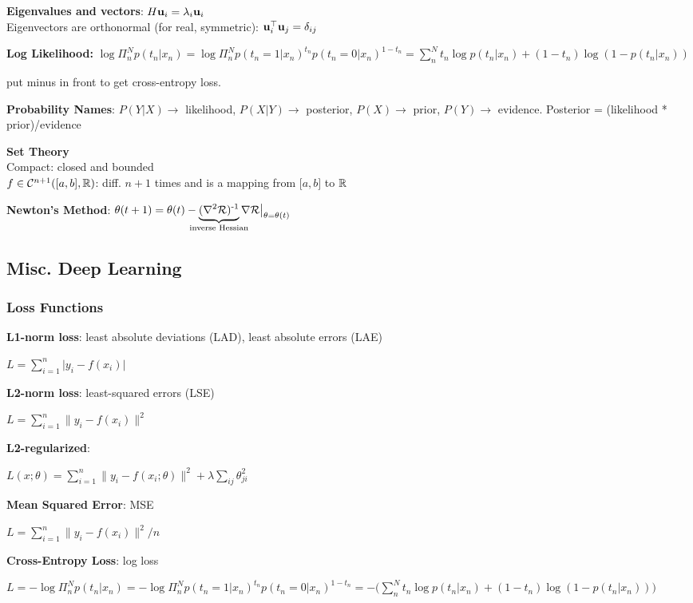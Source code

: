 \textbf{Eigenvalues and vectors}: $H\mathbf u_i=\lambda_i\mathbf u_i$\\
Eigenvectors are orthonormal (for real, symmetric): $\mathbf u_i^{\mathop{\mathrm{\top}}}\mathbf u_j=\delta_{ij}$

\textbf{Log Likelihood:} $\log\Pi^N_n p(t_n|x_n)=\log\Pi^N_n p(t_n=1|x_n)^{t_n} p(t_n=0|x_n)^{1-t_n}=\sum^N_n t_n \log p(t_n|x_n) + (1-t_n) \log (1-p(t_n|x_n))$

\tab put minus in front to get cross-entropy loss.

\textbf{Probability Names}: $P(Y|X)\xrightarrow{}$ likelihood, $P(X|Y)\xrightarrow{}$ posterior, $P(X)\xrightarrow{}$ prior, $P(Y)\xrightarrow{}$ evidence. Posterior = (likelihood * prior)/evidence

\textbf{Set Theory}\\
Compact: closed and bounded\\
$f\in\mathcal{C}^{n+1}(\lbrack a,b\rbrack,\mathbb R)$: diff. $n+1$ times and is a mapping from $\lbrack a,b\rbrack$ to $\mathbb R$

\textbf{Newton's Method}: $\theta(t+1)=\theta(t)-\!\!\!\!\!\underbrace{(\nabla^2\cR)\inv}_\text{inverse Hessian}\!\!\!\!\!\nabla\cR\bigr|_{\theta=\theta(t)}$

\subsection*{Misc. Deep Learning}
\subsubsection*{Loss Functions}
\textbf{L1-norm loss}: least absolute deviations (LAD), least absolute errors (LAE) 

\tab $L=\sum^n_{i=1} \lvert y_i - f(x_i) \rvert$

\textbf{L2-norm loss}: least-squared errors (LSE)

\tab $L=\sum^n_{i=1} \lVert y_i - f(x_i) \rVert^2$

\textbf{L2-regularized}:

\tab $L(x;\theta)=\sum^n_{i=1} \lVert y_i - f(x_i;\theta) \rVert^2 + \lambda\sum_{ij}\theta_{ji}^2$

\textbf{Mean Squared Error}: MSE

\tab $L=\sum^n_{i=1} \lVert y_i - f(x_i) \rVert^2 / n$

\textbf{Cross-Entropy Loss}: log loss

$L=-\log\Pi^N_n p(t_n|x_n)=-\log\Pi^N_n p(t_n=1|x_n)^{t_n} p(t_n=0|x_n)^{1-t_n}=-\bigr(\sum^N_n t_n \log p(t_n|x_n) + (1-t_n) \log (1-p(t_n|x_n))\bigr)$



